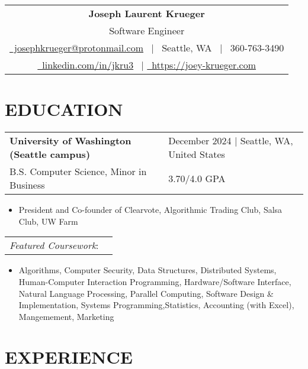 \documentclass[10.5pt,letterpaper]{article}
\makeatletter
\newcommand{\header}[1]{
    \noindent
    \begin{tabularx}{\linewidth}{@{} C @{}}
        \Huge\textbf{Joseph Laurent Krueger} \\[5pt]
        {\Large #1} \\[5pt]
        \href{mailto:josephfkrueger@protonmail.com}{{\color{primarycolor}\faEnvelope}\ josephkrueger@protonmail.com} \ $|$ 
        {{\color{primarycolor}\faMapPin}\ Seattle, WA} \ $|$ 
        {{\color{primarycolor}\faMobile}\ 360-763-3490} \\[3pt]
        \href{https://linkedin.com/in/jkru3}{{\color{primarycolor}\faLinkedin}\ linkedin.com/in/jkru3} \ $|$ 
        \href{https://joey-krueger.com}{{\color{primarycolor}\faGlobeAmericas}\ https://joey-krueger.com}
    \end{tabularx}
}
\newcommand{\educationentry}[5]{
    \begin{tabularx}{\textwidth}{lX}
        \textbf{#1} & \hfill {\textcolor{primarycolor}{#3}} $|$ #4 \\[0pt]
        #2 & \hfill #5 \\[0pt]
    \end{tabularx}
}
\makeatother
\begin{document}
\header{Software Engineer}
\vspace{-10pt}

\section{\faGraduationCap{ }EDUCATION}
\vspace{4pt}
\educationentry{University of Washington (Seattle campus)}{B.S. Computer Science, Minor in Business}{December 2024}{Seattle, WA, United States}{3.70/4.0 GPA}
\begin{itemize}[leftmargin=1.5em, nosep, noitemsep] %
  \item[] President and Co-founder of Clearvote, Algorithmic Trading Club, Salsa Club, UW Farm
\end{itemize}
\begin{tabularx}{\textwidth}{lX}
  \textit{Featured Coursework}: & \\ 
\end{tabularx}
\begin{itemize}[leftmargin=1.5em, nosep, noitemsep] %
  \item[] Algorithms, Computer Security, Data Structures, Distributed Systems, Human-Computer Interaction Programming, Hardware/Software Interface, Natural Language Processing, Parallel Computing, Software Design \& Implementation, Systems Programming,Statistics, Accounting (with Excel), Mangemement, Marketing \\
\end{itemize}
\vspace{-15pt}

\section{\faCode{ }EXPERIENCE}
\vspace{4pt}




\vspace{-10pt}
\end{document}
